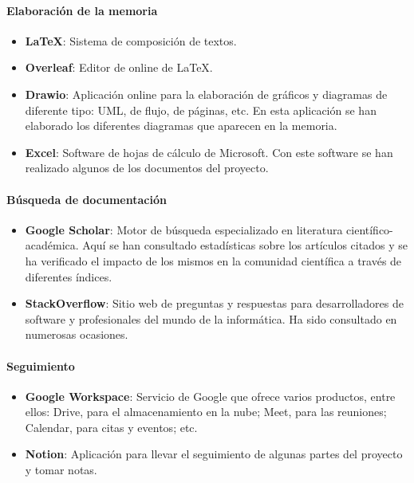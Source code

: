 \paragraph{Elaboración de la memoria}
\begin{itemize}
    \item \textbf{\LaTeX}: Sistema de composición de textos.
    \item \textbf{Overleaf}: Editor de online de \LaTeX.
    \item \textbf{Drawio}: Aplicación online para la elaboración de gráficos y diagramas de diferente tipo: UML, de flujo, de páginas, etc. En esta aplicación se han elaborado los diferentes diagramas que aparecen en la memoria.
    \item \textbf{Excel}: Software de hojas de cálculo de Microsoft. Con este software se han realizado algunos de los documentos del proyecto.
\end{itemize}

\paragraph{Búsqueda de documentación}
\begin{itemize}
    \item \textbf{Google Scholar}: Motor de búsqueda especializado en literatura científico-académica. Aquí se han consultado estadísticas sobre los artículos citados y se ha verificado el impacto de los mismos en la comunidad científica a través de diferentes índices.
    \item \textbf{StackOverflow}: Sitio web de preguntas y respuestas para desarrolladores de software y profesionales del mundo de la informática. Ha sido consultado en numerosas ocasiones.
\end{itemize}

\paragraph{Seguimiento}
\begin{itemize}
    \item \textbf{Google Workspace}: Servicio de Google que ofrece varios productos, entre ellos: Drive, para el almacenamiento en la nube; Meet, para las reuniones; Calendar, para citas y eventos; etc. 
    \item \textbf{Notion}: Aplicación para llevar el seguimiento de algunas partes del proyecto y tomar notas.
\end{itemize}

